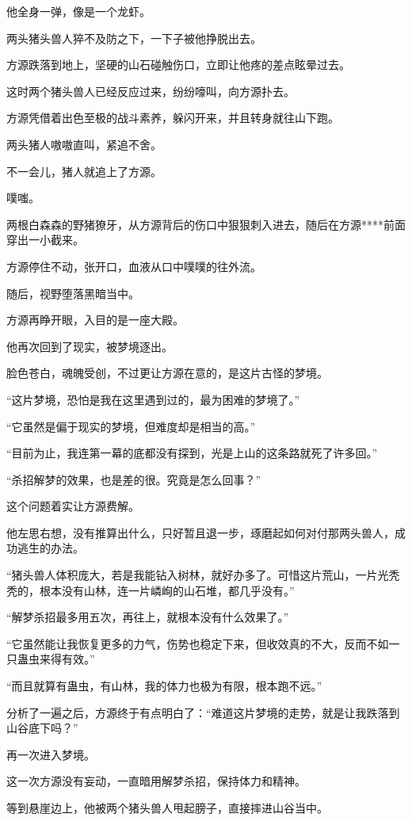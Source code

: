 \begin{this_body}
他全身一弹，像是一个龙虾。

两头猪头兽人猝不及防之下，一下子被他挣脱出去。

方源跌落到地上，坚硬的山石碰触伤口，立即让他疼的差点眩晕过去。

这时两个猪头兽人已经反应过来，纷纷嚎叫，向方源扑去。

方源凭借着出色至极的战斗素养，躲闪开来，并且转身就往山下跑。

两头猪人嗷嗷直叫，紧追不舍。

不一会儿，猪人就追上了方源。

噗嗤。

两根白森森的野猪獠牙，从方源背后的伤口中狠狠刺入进去，随后在方源****前面穿出一小截来。

方源停住不动，张开口，血液从口中噗噗的往外流。

随后，视野堕落黑暗当中。

方源再睁开眼，入目的是一座大殿。

他再次回到了现实，被梦境逐出。

脸色苍白，魂魄受创，不过更让方源在意的，是这片古怪的梦境。

“这片梦境，恐怕是我在这里遇到过的，最为困难的梦境了。”

“它虽然是偏于现实的梦境，但难度却是相当的高。”

“目前为止，我连第一幕的底都没有探到，光是上山的这条路就死了许多回。”

“杀招解梦的效果，也是差的很。究竟是怎么回事？”

这个问题着实让方源费解。

他左思右想，没有推算出什么，只好暂且退一步，琢磨起如何对付那两头兽人，成功逃生的办法。

“猪头兽人体积庞大，若是我能钻入树林，就好办多了。可惜这片荒山，一片光秃秃的，根本没有山林，连一片嶙峋的山石堆，都几乎没有。”

“解梦杀招最多用五次，再往上，就根本没有什么效果了。”

“它虽然能让我恢复更多的力气，伤势也稳定下来，但收效真的不大，反而不如一只蛊虫来得有效。”

“而且就算有蛊虫，有山林，我的体力也极为有限，根本跑不远。”

分析了一遍之后，方源终于有点明白了：“难道这片梦境的走势，就是让我跌落到山谷底下吗？”

再一次进入梦境。

这一次方源没有妄动，一直暗用解梦杀招，保持体力和精神。

等到悬崖边上，他被两个猪头兽人甩起膀子，直接摔进山谷当中。


\end{this_body}
